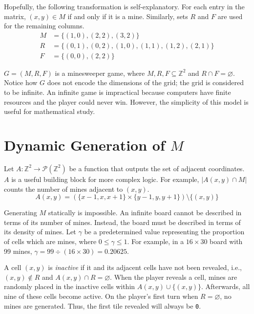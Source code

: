 \documentclass[12pt]{article}
\begin{document}
Hopefully, the following transformation is self-explanatory.
For each entry in the matrix, \((x, y) \in M\) if and only if it is a mine.
Similarly, sets \(R\) and \(F\) are used for the remaining columns.
\[
    \begin{aligned}
        M & = \{(1, 0), (2, 2), (3, 2)\}                         \\
        R & = \{(0, 1), (0, 2), (1, 0), (1, 1), (1, 2), (2, 1)\} \\
        F & = \{(0, 0), (2, 2)\}
    \end{aligned}
\]

\(G = (M, R, F)\) is a minesweeper game, where \(M, R, F \subseteq \mathbb{Z}^2\) and \(R \cap F = \varnothing \).
Notice how \(G\) does not encode the dimensions of the grid; the grid is considered to be infinite.
An infinite game is impractical because computers have finite resources and the player could never win.
However, the simplicity of this model is useful for mathematical study.


\section{Dynamic Generation of \(M\)}

Let \(A : \mathbb{Z}^2 \to \mathcal{P}(\mathbb{Z}^2)\) be a function that outputs the set of adjacent coordinates.
\(A\) is a useful building block for more complex logic.
For example, \(|A(x, y) \cap M|\) counts the number of mines adjacent to \((x,y)\).
\[A(x, y) = (\{x - 1, x, x + 1\} \times \{y - 1, y, y + 1\}) \setminus \{(x, y)\} \]

Generating \(M\) statically is impossible.
An infinite board cannot be described in terms of its number of mines.
Instead, the board must be described in terms of its density of mines.
Let \(\gamma \) be a predetermined value representing the proportion of cells which are mines, where \(0 \leq \gamma \leq 1\).
For example, in a \(16 \times 30\) board with 99 mines, \(\gamma = 99 \div (16 \times 30) = 0.20625\).

A cell \((x, y)\) is \textit{inactive} if it and its adjacent cells have not been revealed, i.e., \((x, y) \notin R\) and \(A(x, y) \cap R = \varnothing \).
When the player reveals a cell, mines are randomly placed in the inactive cells within \(A(x, y) \cup \{(x, y)\} \).
Afterwards, all nine of these cells become active.
On the player's first turn when \(R = \varnothing \), no mines are generated.
Thus, the first tile revealed will always be \texttt{0}.
\end{document}
